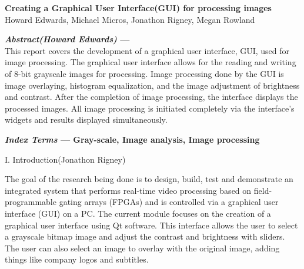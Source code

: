 \documentclass{article}
\begin{document}
\begin{center}

\vspace* {15 pt}
\Huge{\bf Creating  a Graphical User Interface(GUI) for processing images }\\
\vspace {20 pt}
\large{Howard Edwards, Michael Micros, Jonathon  Rigney, Megan Rowland \\}

\end{center}

\vspace{20 pt}




\begin{multicols*}{2}

{\bf  \textit {Abstract(Howard Edwards)} ---
}\\
     This report covers the development of a graphical user interface, GUI, used for image processing. The graphical user interface allows for the reading and writing of 8-bit grayscale images for processing. Image processing done by the GUI is image overlaying, histogram equalization, and the image adjustment of brightness and contrast. After the completion of image processing, the interface displays the processed images. All image processing is initiated completely via the interface’s widgets and results displayed simultaneously. 


{\bf  \textit {Index Terms} --- Gray-scale, Image analysis, Image processing
}




\begin{center}
\large{I. Introduction(Jonathon Rigney)}
\end{center}

The goal of the research being done is to design,  build, test and demonstrate an integrated system that performs real-time video processing based on field-programmable gating arrays (FPGAs) and is controlled via a graphical user interface (GUI) on a PC.
The current module focuses on the creation of a graphical user interface using Qt software. This interface allows the user to select a grayscale bitmap image and adjust the contrast and brightness with sliders. The user can also select an image to overlay with the original image, adding things like company logos and subtitles. 




\end{multicols*}
\end{document}
